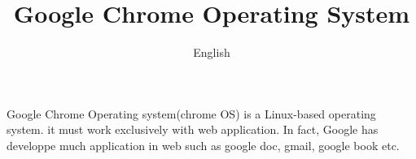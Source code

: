 \documentclass[12pt,a4paper,openany]{article}
\title{Google Chrome Operating System}
\date{English}
\begin{document}
	\maketitle
	Google Chrome Operating system(chrome OS) is a Linux-based operating system. it must work 
	exclusively with web application. In fact, Google has developpe much application in web such 
	as google doc, gmail, google book etc.
\end{document}
